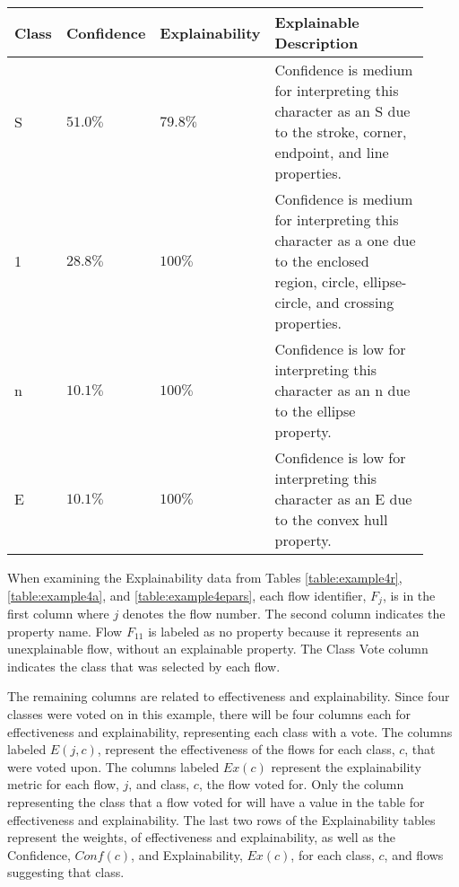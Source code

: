 \begin{table}[H]
    \renewcommand{\arraystretch}{1.3}
     \label{table:exexample4a}
    \begin{center}
    \begin{tabular}{| m{0.06\linewidth} | m{0.14\linewidth} | m{0.17\linewidth} | m{0.55\linewidth} |}
        \hline
        Class & Confidence & Explainability & Explainable Description \\
        \hline \hline
        S & $51.0\%$ & $79.8\%$ & Confidence is medium for interpreting this character as an S due to the stroke, corner, endpoint, and line properties. \\ 
        \hline
        1 & $28.8\%$ & $100\%$ & Confidence is medium for interpreting this character as a one due to the enclosed region, circle, ellipse-circle, and crossing properties. \\
        \hline
        n & $10.1\%$ & $100\%$ & Confidence is low for interpreting this character as an n due to the ellipse property. \\
        \hline
        E & $10.1\%$ & $100\%$ & Confidence is low for interpreting this character as an E due to the convex hull property. \\
       \hline
    \end{tabular}
    \end{center}
\end{table}

When examining the Explainability data from Tables \ref{table:example4r},
\ref{table:example4a}, and \ref{table:example4epars}, each flow identifier,
$F_j$, is in the first column where $j$ denotes the flow number.  The second
column indicates the property name. Flow $F_{11}$ is labeled as no property
because it represents an unexplainable flow, without an explainable property.
The Class Vote column indicates the class that was selected by each flow.

The remaining columns are related to effectiveness and explainability.  Since
four classes were voted on in this example, there will be four columns each for
effectiveness and explainability, representing each class with a vote. The
columns labeled $E(j,c)$, represent the effectiveness of the flows for each
class, $c$, that were voted upon. The columns labeled $Ex(c)$ represent the
explainability metric for each flow, $j$, and class, $c$, the flow voted for.
Only the column representing the class that a flow voted for will have a value
in the table for effectiveness and explainability.  The last two rows of the
Explainability tables represent the weights, of effectiveness and
explainability, as well as the Confidence, $Conf(c)$, and Explainability,
$Ex(c)$, for each class, $c$, and flows suggesting that class.

